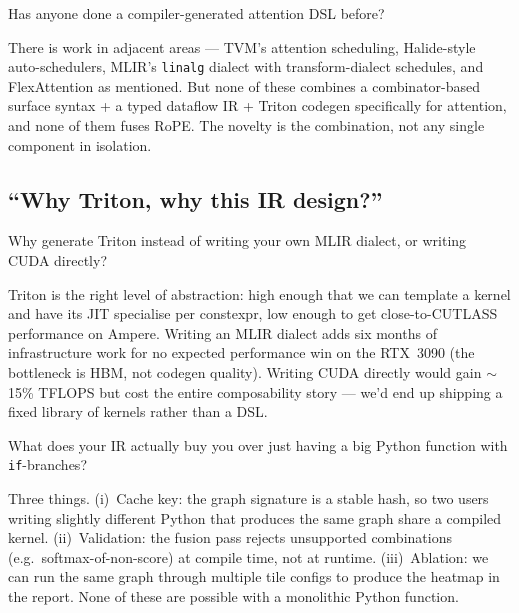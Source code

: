 \documentclass[11pt]{article}
\begin{document}
\begin{question}{Has anyone done a compiler-generated attention DSL before?}
\end{question}
\begin{answer}
There is work in adjacent areas --- TVM's attention scheduling, Halide-style
auto-schedulers, MLIR's \texttt{linalg} dialect with transform-dialect
schedules, and FlexAttention as mentioned. But none of these combines a
combinator-based surface syntax + a typed dataflow IR + Triton codegen
specifically for attention, and none of them fuses RoPE. The novelty is
the combination, not any single component in isolation.
\end{answer}

\subsection{``Why Triton, why this IR design?''}

\begin{question}{Why generate Triton instead of writing your own MLIR
dialect, or writing CUDA directly?}
\end{question}
\begin{answer}
Triton is the right level of abstraction: high enough that we can template
a kernel and have its JIT specialise per constexpr, low enough to get
close-to-CUTLASS performance on Ampere. Writing an MLIR dialect adds
six months of infrastructure work for no expected performance win on the
RTX~3090 (the bottleneck is HBM, not codegen quality). Writing CUDA directly
would gain $\sim$15\% TFLOPS but cost the entire composability story --- we'd
end up shipping a fixed library of kernels rather than a DSL.
\end{answer}

\begin{question}{What does your IR actually buy you over just having a big
Python function with \texttt{if}-branches?}
\end{question}
\begin{answer}
Three things. (i)~Cache key: the graph signature is a stable hash, so two
users writing slightly different Python that produces the same graph share a
compiled kernel. (ii)~Validation: the fusion pass rejects unsupported
combinations (e.g.~softmax-of-non-score) at compile time, not at runtime.
(iii)~Ablation: we can run the same graph through multiple tile configs to
produce the heatmap in the report. None of these are possible with a
monolithic Python function.
\end{answer}
\end{document}
